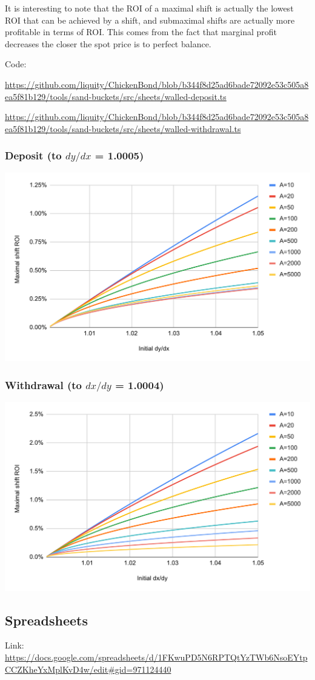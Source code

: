 \documentclass{article}
\begin{document}
It is interesting to note that the ROI of a maximal shift is actually the lowest ROI that can be achieved by a shift, and submaximal shifts are actually more profitable in terms of ROI. This comes from the fact that marginal profit decreases the closer the spot price is to perfect balance.

Code:

\url{https://github.com/liquity/ChickenBond/blob/b344f8d25ad6bade72092e53c505a8ea5f81b129/tools/sand-buckets/src/sheets/walled-deposit.ts}

\url{https://github.com/liquity/ChickenBond/blob/b344f8d25ad6bade72092e53c505a8ea5f81b129/tools/sand-buckets/src/sheets/walled-withdrawal.ts}

\subsubsection{Deposit (to $dy/dx$ = 1.0005)}

\includegraphics[width=\linewidth]{./LUSDChickenBonds_Shifting_Profitability_5.png}

\subsubsection{Withdrawal (to $dx/dy$ = 1.0004)}

\includegraphics[width=\linewidth]{./LUSDChickenBonds_Shifting_Profitability_6.png}

\subsection{Spreadsheets}

Link:
\url{https://docs.google.com/spreadsheets/d/1FKwuPD5N6RPTQtYzTWb6NsoEYtpCCZKheYxMplKvD4w/edit#gid=971124440}
\end{document}
